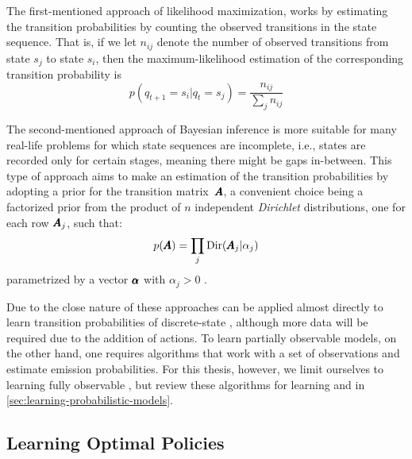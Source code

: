 The first-mentioned approach of likelihood maximization, works by estimating the transition probabilities by counting the observed transitions in the state sequence.
That is, if we let $n_{ij}$ denote the number of observed transitions from state $s_j$ to state $s_i$, then the maximum-likelihood estimation of the corresponding transition probability is
\begin{equation}
p(q_{t+1} = s_i\vert q_t = s_j) = \frac{n_{ij}}{\sum_j n_{ij}}
\end{equation}

The second-mentioned approach of Bayesian inference is more suitable for many real-life problems for which state sequences are incomplete, i.e., states are recorded only for certain stages, meaning there might be gaps in-between.
This type of approach aims to make an estimation of the transition probabilities by adopting a prior for the transition matrix~$\pmb{A}$, a convenient choice being a factorized prior from the product of $n$ independent \textit{Dirichlet} distributions, one for each row $\pmb{A}_j$, such that:
\begin{equation}
p(\pmb{A}) = \prod_{j} \text{Dir}(\pmb{A}_j \vert \alpha_j)
\end{equation}
parametrized by a vector $\pmb{\alpha}$ with $\alpha_j > 0$ \cite{pasanisi2012estimating,barberBRML2012}.

Due to the close nature of  these approaches can be applied almost directly to learn transition probabilities of discrete-state , although more data will be required due to the addition of actions.
To learn partially observable models, on the other hand, one requires algorithms that work with a set of observations and estimate emission probabilities.
For this thesis, however, we limit ourselves to learning fully observable , but review these algorithms for learning  and  in \autoref{sec:learning-probabilistic-models}.

\subsection{Learning Optimal Policies}
\label{sec:planning}


